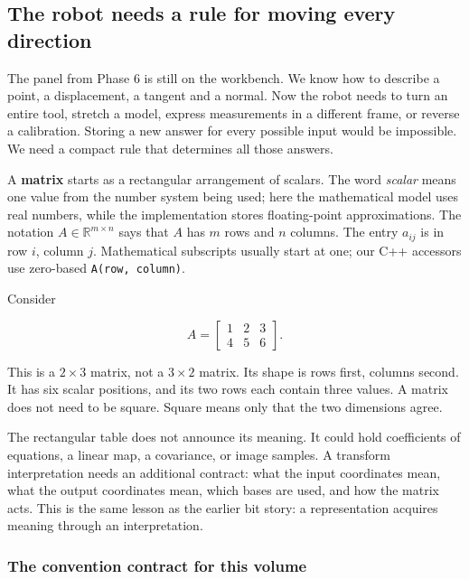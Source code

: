 \subsection{The robot needs a rule for moving every direction}\label{01-foundations-i-ch018-the-robot-needs-a-rule-for-moving-every-direction}

\hypertarget{01-foundations-i-ch018-the-robot-needs-a-rule-for-moving-every-direction}{}

The panel from Phase 6 is still on the workbench. We know how to describe a point, a displacement, a tangent and a normal. Now the robot needs to turn an entire tool, stretch a model, express measurements in a different frame, or reverse a calibration. Storing a new answer for every possible input would be impossible. We need a compact rule that determines all those answers.

A \textbf{matrix} starts as a rectangular arrangement of scalars. The word \emph{scalar} means one value from the number system being used; here the mathematical model uses real numbers, while the implementation stores floating-point approximations. The notation \(A\in\mathbb R^{m\times n}\) says that \(A\) has \(m\) rows and \(n\) columns. The entry \(a_{ij}\) is in row \(i\), column \(j\). Mathematical subscripts usually start at one; our C++ accessors use zero-based \texttt{A(row,\ column)}.

Consider

\[
A=\begin{bmatrix}1&2&3\\4&5&6\end{bmatrix}.
\]

This is a \(2\times3\) matrix, not a \(3\times2\) matrix. Its shape is rows first, columns second. It has six scalar positions, and its two rows each contain three values. A matrix does not need to be square. Square means only that the two dimensions agree.

The rectangular table does not announce its meaning. It could hold coefficients of equations, a linear map, a covariance, or image samples. A transform interpretation needs an additional contract: what the input coordinates mean, what the output coordinates mean, which bases are used, and how the matrix acts. This is the same lesson as the earlier bit story: a representation acquires meaning through an interpretation.

\subsubsection{The convention contract for this volume}\label{01-foundations-i-ch018-the-convention-contract-for-this-volume}

